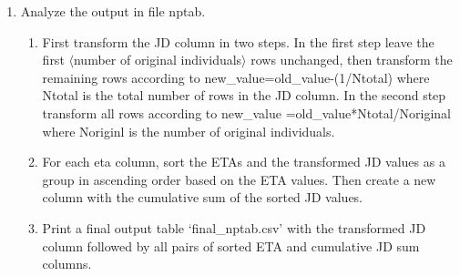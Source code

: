 \begin{enumerate}
\item Analyze the output in file nptab. 
	\begin{enumerate}
		\item First transform the JD column in two steps. In the first step leave the first $\langle$number of original individuals$\rangle$ rows unchanged, then transform the remaining rows according to new\_value=old\_value-(1/Ntotal) where Ntotal is the total number of rows in the JD column. In the second step transform all rows according to new\_value =old\_value*Ntotal/Noriginal where Noriginl is the number of original individuals.
		\item For each eta column,  sort the ETAs and the transformed JD values as a group in ascending order based on the ETA values. Then create a new column with the cumulative sum of the sorted JD values.
		\item Print a final output table ‘final\_nptab.csv’ with the transformed JD column followed by all pairs of sorted ETA and cumulative  JD sum columns.
	\end{enumerate}
\end{enumerate}


